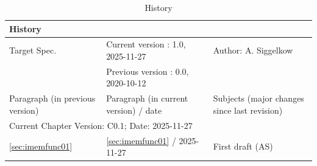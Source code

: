 \begin{table}[H]
\caption{History}
\label{tab:imemhistory02}
\centering
\begin{tabularx}{\textwidth}{|X |X |X |}
  \hline
  \multicolumn{3}{|l|}{History} \\
  \hline
  \multicolumn{1}{|l}{Target Spec.} & \multicolumn{1}{l}{Current version : 1.0, 2025-11-27} & \multicolumn{1}{l|}{Author: A. Siggelkow}\\
  \multicolumn{1}{|l}{ } & \multicolumn{1}{l}{Previous version : 0.0, 2020-10-12} & \multicolumn{1}{l|}{ }\\
  \hline
  \hline
  Paragraph (in previous version) & Paragraph (in current version) / date & Subjects (major changes since last revision) \\
  \hline
  \hline
  \multicolumn{3}{|l|}{Current Chapter Version: C0.1; Date: 2025-11-27} \\
  \hline
  \ref{sec:imemfunc01} & \ref{sec:imemfunc01} / 2025-11-27 & First draft (AS) \\
  \hline
\end{tabularx}
\end{table}
